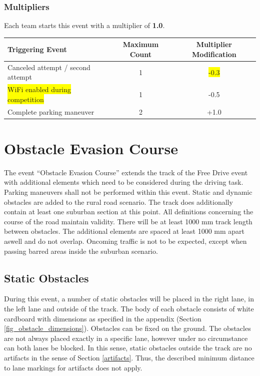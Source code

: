 \documentclass[a4paper]{report}
\begin{document}
{\subsubsection{Multipliers}
\label{freedrive_multipliers}

Each team starts this event with a multiplier of \textbf{1.0}. 

\begin{table}[H]
\begin{tabular}{@{}lcc@{}}
\toprule
\textbf{Triggering Event}         & \textbf{Maximum Count} & \textbf{Multiplier Modification} \\ \midrule
Canceled attempt / second attempt & 1                      & \colorbox{yellow}{-0.3}                             \\
\colorbox{yellow}{WiFi enabled during competition}   & 1   & -0.5 \\
Complete parking maneuver         & 2                      & +1.0                     
\\
\bottomrule
\end{tabular}
\end{table}

\section{Obstacle Evasion Course}

The event “Obstacle Evasion Course” extends the track of the Free Drive event with additional elements which need to be considered during the driving task. Parking maneuvers shall not be performed within this event. Static and dynamic obstacles are added to the rural road scenario. The track does additionally contain at least one suburban section at this point. All definitions concerning the course of the road maintain validity. There will be at least 1000 mm track length between obstacles. The additional elements are spaced at least 1000 mm apart aswell and do not overlap. Oncoming traffic is not to be expected, except when passing barred areas inside the suburban scenario. 

\subsection{Static Obstacles}

During this event, a number of static obstacles will be placed in the right lane, in the left lane and outside of the track. The body of each obstacle consists of white cardboard with dimensions as specified in the appendix (Section \ref{fig_obstacle_dimensions}). Obstacles can be fixed on the ground. The obstacles are not always placed exactly in a specific lane, however under no circumstance can both lanes be blocked. In this sense, static obstacles outside the track are no artifacts in the sense of Section \ref{artifacts}. Thus, the described minimum distance to lane markings for artifacts does not apply. 

}
\end{document}

